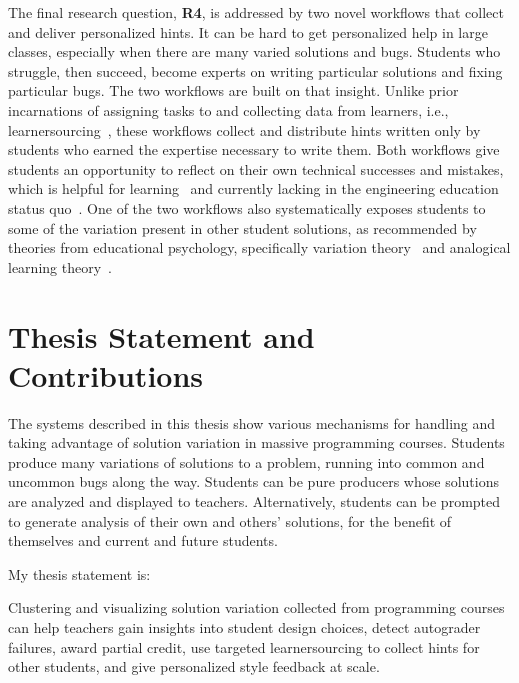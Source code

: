 The final research question, {\bf R4}, is addressed by two novel workflows that collect and deliver personalized hints. It can be hard to get personalized help in large classes, especially when there are many varied solutions and bugs. Students who struggle, then succeed, become experts on writing particular solutions and fixing particular bugs. The two workflows are built on that insight. Unlike prior incarnations of assigning tasks to and collecting data from learners, i.e., learnersourcing~\cite{kim2013learnersourcing}, these workflows collect and distribute hints written only by students who earned the expertise necessary to write them. Both workflows give students an opportunity to reflect on their own technical successes and mistakes, which is helpful for learning~\cite{dewey1933} and currently lacking in the engineering education status quo~\cite{asee}. One of the two workflows also systematically exposes students to some of the variation present in other student solutions, as recommended by theories from educational psychology, specifically variation theory~\cite{marton1997learning} and analogical learning theory~\cite{kurtz01learning,loewenstein2003analogical}.

\section{Thesis Statement and Contributions}

The systems described in this thesis show various mechanisms for handling and taking advantage of solution variation in massive programming courses. Students produce many variations of solutions to a problem, running into common and uncommon bugs along the way. Students can be pure producers whose solutions are analyzed and displayed to teachers. Alternatively, students can be prompted to generate analysis of their own and others' solutions, for the benefit of themselves and current and future students. %

My thesis statement is: 
\begin{displayquote}
Clustering and visualizing solution variation collected from programming courses can help teachers gain insights into student design choices, detect autograder failures, award partial credit, use targeted learnersourcing to collect hints for other students, and give personalized style feedback at scale.
\end{displayquote}

